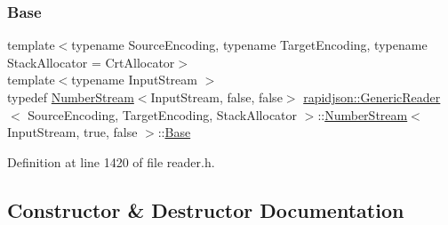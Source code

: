 \subsubsection{\texorpdfstring{Base}{Base}}
{\footnotesize\ttfamily template$<$typename Source\+Encoding, typename Target\+Encoding, typename Stack\+Allocator = Crt\+Allocator$>$ \\
template$<$typename Input\+Stream $>$ \\
typedef \mbox{\hyperlink{classrapidjson_1_1_generic_reader_1_1_number_stream}{Number\+Stream}}$<$Input\+Stream, false, false$>$ \mbox{\hyperlink{classrapidjson_1_1_generic_reader}{rapidjson\+::\+Generic\+Reader}}$<$ Source\+Encoding, Target\+Encoding, Stack\+Allocator $>$\+::\mbox{\hyperlink{classrapidjson_1_1_generic_reader_1_1_number_stream}{Number\+Stream}}$<$ Input\+Stream, true, false $>$\+::\mbox{\hyperlink{classrapidjson_1_1_generic_reader_1_1_number_stream_3_01_input_stream_00_01true_00_01false_01_4_a1765e18550d8e335475e6dfe101ac997}{Base}}\hspace{0.3cm}{\ttfamily [private]}}



Definition at line 1420 of file reader.\+h.



\subsection{Constructor \& Destructor Documentation}
\mbox{\label{classrapidjson_1_1_generic_reader_1_1_number_stream_3_01_input_stream_00_01true_00_01false_01_4_ac5fb9c88655641fbc9a8532c7acb0220}} 
